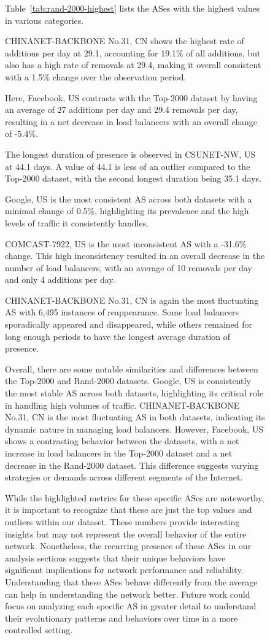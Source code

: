 \documentclass[12pt]{cwru_thesis}
\begin{document}
\begin{figure}[h!]
Table~\ref{tab:rand-2000-highest} lists the ASes with the highest values in various categories.

CHINANET-BACKBONE No.31, CN shows the highest rate of additions per day at 29.1, accounting for 19.1\% of all additions, but also has a high rate of removals at 29.4, making it overall consistent with a 1.5\% change over the observation period. 

Here, Facebook, US contrasts with the Top-2000 dataset by having an average of 27 additions per day and 29.4 removals per day, resulting in a net decrease in load balancers with an overall change of -5.4\%.

The longest duration of presence is observed in CSUNET-NW, US at 44.1 days. A value of 44.1 is less of an outlier compared to the Top-2000 dataset, with the second longest duration being 35.1 days.

Google, US is the most consistent AS across both datasets with a minimal change of 0.5\%, highlighting its prevalence and the high levels of traffic it consistently handles.

COMCAST-7922, US is the most inconsistent AS with a -31.6\% change. This high inconsistency resulted in an overall decrease in the number of load balancers, with an average of 10 removals per day and only 4 additions per day.

CHINANET-BACKBONE No.31, CN is again the most fluctuating AS with 6,495 instances of reappearance. Some load balancers sporadically appeared and disappeared, while others remained for long enough periods to have the longest average duration of presence.

Overall, there are some notable similarities and differences between the Top-2000 and Rand-2000 datasets. Google, US is consistently the most stable AS across both datasets, highlighting its critical role in handling high volumes of traffic. CHINANET-BACKBONE No.31, CN is the most fluctuating AS in both datasets, indicating its dynamic nature in managing load balancers. However, Facebook, US shows a contrasting behavior between the datasets, with a net increase in load balancers in the Top-2000 dataset and a net decrease in the Rand-2000 dataset. This difference suggests varying strategies or demands across different segments of the Internet. 

While the highlighted metrics for these specific ASes are noteworthy, it is important to recognize that these are just the top values and outliers within our dataset. These numbers provide interesting insights but may not represent the overall behavior of the entire network. Nonetheless, the recurring presence of these ASes in our analysis sections suggests that their unique behaviors have significant implications for network performance and reliability. Understanding that these ASes behave differently from the average can help in understanding the network better. Future work could focus on analyzing each specific AS in greater detail to understand their evolutionary patterns and behaviors over time in a more controlled setting.


\end{figure}
\end{document}
